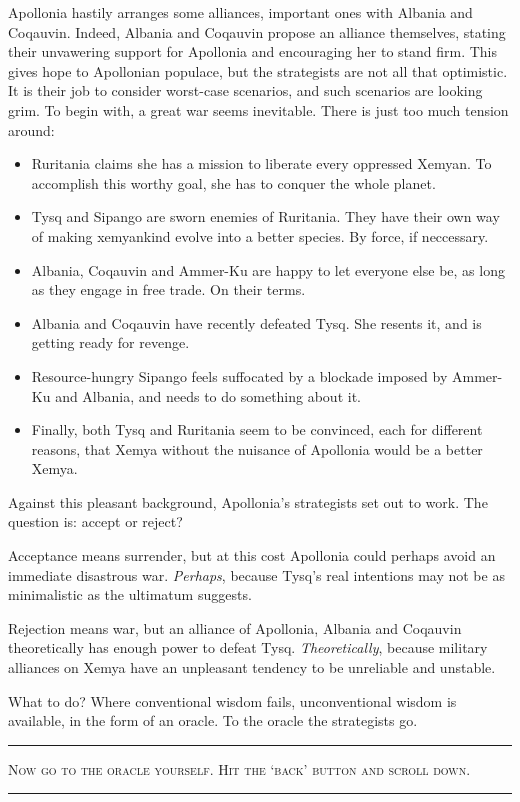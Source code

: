 \documentclass{amsart}
\begin{document}
Apollonia hastily arranges some alliances, important ones with Albania and
Coqauvin. Indeed, Albania and Coqauvin propose an alliance themselves,
stating their unvawering support for Apollonia and encouraging her to stand firm. 
This gives hope to Apollonian populace, but the strategists are not all that
optimistic. It is their job to consider worst-case scenarios, and such scenarios
are looking grim. To begin with, a great war seems inevitable.
There is just too much tension around:
\begin{itemize}  
\item Ruritania claims she has a mission to liberate every oppressed Xemyan.
      To accomplish this worthy goal, she has to conquer the whole planet.
\item Tysq and Sipango are sworn enemies of Ruritania. They have their
      own way of making xemyankind evolve into a better species.
      By force, if neccessary.
\item Albania, Coqauvin and Ammer-Ku are happy to let everyone else
    be, as long as they engage in free trade. On their terms. 
\item Albania and Coqauvin have recently defeated Tysq. She
    resents it, and is getting ready for revenge.
\item Resource-hungry Sipango feels suffocated by a blockade imposed by
      Ammer-Ku and Albania, and needs to do something about it.
\item Finally, both Tysq and Ruritania seem to be convinced, each for
      different reasons, that Xemya without the nuisance of Apollonia would
      be a better Xemya.   
\end{itemize}

Against this pleasant background, Apollonia's strategists set out to
work. The question is: accept or reject?

Acceptance means surrender, but at this cost Apollonia could
perhaps avoid an immediate disastrous war. \emph{Perhaps}, because Tysq's
real intentions may not be as minimalistic as the ultimatum suggests.

Rejection means war, but an alliance of Apollonia, Albania and Coqauvin
theoretically has enough power to defeat Tysq. \emph{Theoretically},
because military alliances on Xemya have an unpleasant tendency to be unreliable
and unstable.
  
What to do? Where conventional wisdom fails, unconventional wisdom
is available, in the form of an oracle. To the oracle the strategists
go.

\vskip1cm
\hrule
\bigskip\noindent
\textsc{Now go to the oracle yourself. Hit the `back' button and scroll down.}
\bigskip
\hrule
\end{document}

